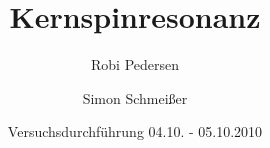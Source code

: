 \documentclass[a4paper,oneside]{scrartcl} %
\title{Kernspinresonanz}
\author{Robi Pedersen \and Simon Schmeißer}
\date{Versuchsdurchführung 04.10. - 05.10.2010}
\begin{document}
\begin{titlepage}
  \maketitle
  \vfill
  \thispagestyle{empty}
\end{titlepage}

\tableofcontents
\clearpage








\clearpage

% 
%
\end{document}
